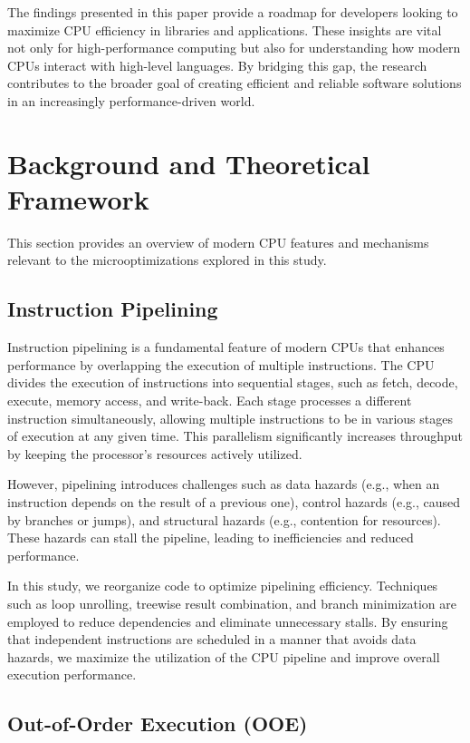 \documentclass{article}
\begin{document}
The findings presented in this paper provide a roadmap for developers looking to maximize CPU efficiency in libraries and applications. These insights are vital not only for high-performance computing but also for understanding how modern CPUs interact with high-level languages. By bridging this gap, the research contributes to the broader goal of creating efficient and reliable software solutions in an increasingly performance-driven world.

\section{Background and Theoretical Framework}

This section provides an overview of modern CPU features and mechanisms relevant to the microoptimizations explored in this study.

\subsection{Instruction Pipelining}

Instruction pipelining is a fundamental feature of modern CPUs that enhances performance by overlapping the execution of multiple instructions. The CPU divides the execution of instructions into sequential stages, such as fetch, decode, execute, memory access, and write-back. Each stage processes a different instruction simultaneously, allowing multiple instructions to be in various stages of execution at any given time. This parallelism significantly increases throughput by keeping the processor's resources actively utilized.

However, pipelining introduces challenges such as data hazards (e.g., when an instruction depends on the result of a previous one), control hazards (e.g., caused by branches or jumps), and structural hazards (e.g., contention for resources). These hazards can stall the pipeline, leading to inefficiencies and reduced performance.

In this study, we reorganize code to optimize pipelining efficiency. Techniques such as loop unrolling, treewise result combination, and branch minimization are employed to reduce dependencies and eliminate unnecessary stalls. By ensuring that independent instructions are scheduled in a manner that avoids data hazards, we maximize the utilization of the CPU pipeline and improve overall execution performance.

\subsection{Out-of-Order Execution (OOE)}
\end{document}
